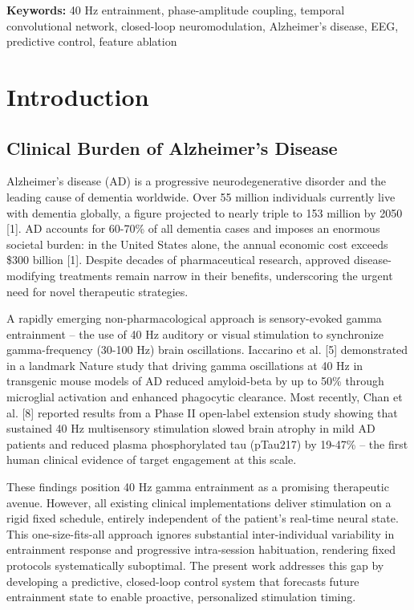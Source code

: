 \documentclass[11pt,letterpaper]{article}
\begin{document}
\vspace{0.5em}
\noindent \textbf{Keywords:} 40 Hz entrainment, phase-amplitude coupling, temporal convolutional network, closed-loop neuromodulation, Alzheimer's disease, EEG, predictive control, feature ablation

\section{Introduction}

\subsection{Clinical Burden of Alzheimer's Disease}

Alzheimer's disease (AD) is a progressive neurodegenerative disorder and the leading cause of dementia worldwide. Over 55 million individuals currently live with dementia globally, a figure projected to nearly triple to 153 million by 2050 [1]. AD accounts for 60-70\% of all dementia cases and imposes an enormous societal burden: in the United States alone, the annual economic cost exceeds \$300 billion [1]. Despite decades of pharmaceutical research, approved disease-modifying treatments remain narrow in their benefits, underscoring the urgent need for novel therapeutic strategies.

A rapidly emerging non-pharmacological approach is sensory-evoked gamma entrainment -- the use of 40 Hz auditory or visual stimulation to synchronize gamma-frequency (30-100 Hz) brain oscillations. Iaccarino et al. [5] demonstrated in a landmark Nature study that driving gamma oscillations at 40 Hz in transgenic mouse models of AD reduced amyloid-beta by up to 50\% through microglial activation and enhanced phagocytic clearance. Most recently, Chan et al. [8] reported results from a Phase II open-label extension study showing that sustained 40 Hz multisensory stimulation slowed brain atrophy in mild AD patients and reduced plasma phosphorylated tau (pTau217) by 19-47\% -- the first human clinical evidence of target engagement at this scale.

These findings position 40 Hz gamma entrainment as a promising therapeutic avenue. However, all existing clinical implementations deliver stimulation on a rigid fixed schedule, entirely independent of the patient's real-time neural state. This one-size-fits-all approach ignores substantial inter-individual variability in entrainment response and progressive intra-session habituation, rendering fixed protocols systematically suboptimal. The present work addresses this gap by developing a predictive, closed-loop control system that forecasts future entrainment state to enable proactive, personalized stimulation timing.
\end{document}
